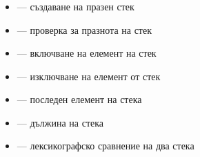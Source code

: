 \documentclass[alsotrans, beameroptions={aspectratio=169}]{beamerswitch}
\begin{document}
\begin{frame}
  \frametitle{}

  \begin{itemize}
  \item {} --- създаване на празен стек
  \item {} --- проверка за празнота на стек
  \item {} --- включване на елемент на стек
  \item {} --- изключване на елемент от стек
  \item {} --- последен елемент на стека
  \item {} --- дължина на стека
  \item \lst{==,!=,<,>,<=,>=} --- лексикографско сравнение на два стека
  \end{itemize}
\end{frame}
\end{document}
